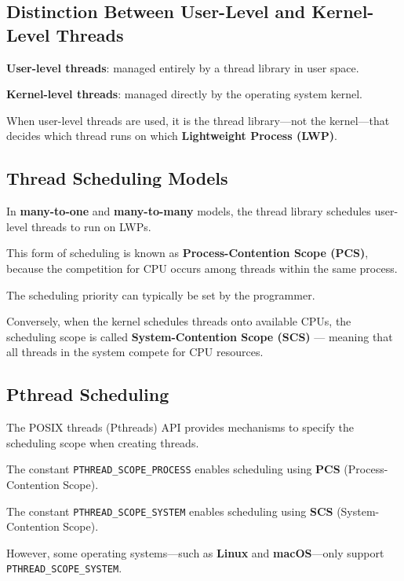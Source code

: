 \subsection{Distinction Between User-Level and Kernel-Level Threads}
\begin{compactitemize}
    \item \textbf{User-level threads}: managed entirely by a thread library in user space.  
    \item \textbf{Kernel-level threads}: managed directly by the operating system kernel.  
\end{compactitemize}

\noindent
When user-level threads are used, it is the thread library—not the kernel—that decides which thread runs on which \textbf{Lightweight Process (LWP)}.

\subsection{Thread Scheduling Models}

\begin{compactitemize}
    \item In \textbf{many-to-one} and \textbf{many-to-many} models, the thread library schedules user-level threads to run on LWPs.  
    \item This form of scheduling is known as \textbf{Process-Contention Scope (PCS)}, because the competition for CPU occurs among threads within the same process.  
    \item The scheduling priority can typically be set by the programmer.
    \item Conversely, when the kernel schedules threads onto available CPUs, the scheduling scope is called \textbf{System-Contention Scope (SCS)} — meaning that all threads in the system compete for CPU resources.  
\end{compactitemize}

\subsection{Pthread Scheduling}

The POSIX threads (Pthreads) API provides mechanisms to specify the scheduling scope when creating threads.

\begin{compactitemize}
    \item The constant \texttt{PTHREAD\_SCOPE\_PROCESS} enables scheduling using \textbf{PCS} (Process-Contention Scope).  
    \item The constant \texttt{PTHREAD\_SCOPE\_SYSTEM} enables scheduling using \textbf{SCS} (System-Contention Scope).  
    \item However, some operating systems—such as \textbf{Linux} and \textbf{macOS}—only support \texttt{PTHREAD\_SCOPE\_SYSTEM}.  
\end{compactitemize}

